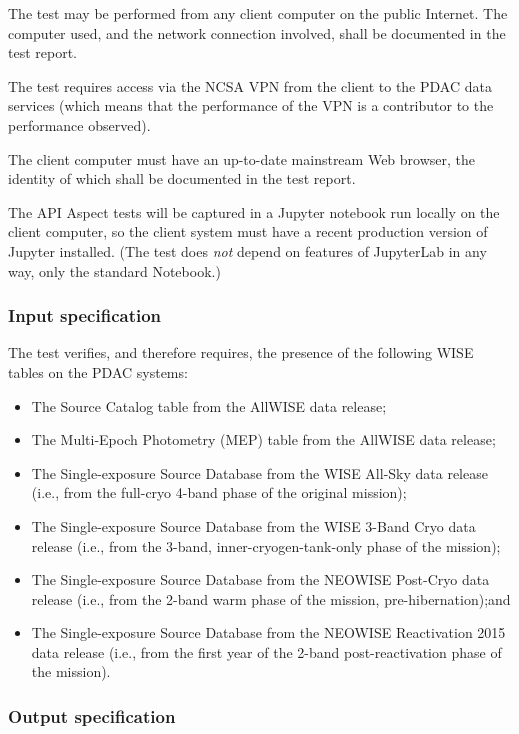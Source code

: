 The test may be performed from any client computer on the public Internet.
The computer used, and the network connection involved, shall be documented in the test report.

The test requires access via the NCSA VPN from the client to the PDAC data services 
(which means that the performance of the VPN is a contributor to the performance observed).

The client computer must have an up-to-date mainstream Web browser, the identity of which shall be documented in the test report.

The API Aspect tests will be captured in a Jupyter notebook run locally on the client computer, so the client system must have a recent production version of Jupyter installed.
(The test does \emph{not} depend on features of JupyterLab in any way, only the standard Notebook.)


\subsubsection{Input specification}

The test verifies, and therefore requires, the presence of the following WISE tables on the PDAC systems:

\begin{itemize}

  \item{The Source Catalog table from the AllWISE data release;}
  \item{The Multi-Epoch Photometry (MEP) table from the AllWISE data release;}
  \item{The Single-exposure Source Database from the WISE All-Sky data release (i.e., from the full-cryo 4-band phase of the original mission);}
  \item{The Single-exposure Source Database from the WISE 3-Band Cryo data release (i.e., from the 3-band, inner-cryogen-tank-only phase of the mission);}
  \item{The Single-exposure Source Database from the NEOWISE Post-Cryo data release (i.e., from the 2-band warm phase of the mission, pre-hibernation);and}
  \item{The Single-exposure Source Database from the NEOWISE Reactivation 2015 data release (i.e., from the first year of the 2-band post-reactivation phase of the mission).}
\end{itemize}


\subsubsection{Output specification}

